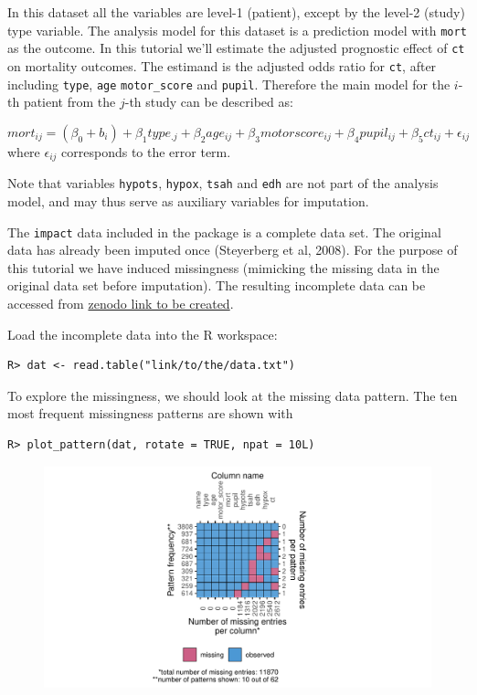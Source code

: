 \documentclass[
  article]{jss}
\begin{document}
In this dataset all the variables are level-1 (patient), except by the
level-2 (study) type variable. The analysis model for this dataset is a
prediction model with \texttt{mort} as the outcome. In this tutorial
we'll estimate the adjusted prognostic effect of \texttt{ct} on
mortality outcomes. The estimand is the adjusted odds ratio for
\texttt{ct}, after including \texttt{type}, \texttt{age}
\texttt{motor\_score} and \texttt{pupil}. Therefore the main model for
the \(i\)-th patient from the \(j\)-th study can be described as:

\[ mort_{ij} = (\beta_0 + b_i) + \beta_1type_{.j}+ \beta_2age_{ij}+ \beta_3motorscore_{ij} + \beta_4pupil_{ij} + \beta_5ct_{ij}+\epsilon_{ij}\]
where \(\epsilon_{ij}\) corresponds to the error term.

Note that variables \texttt{hypots}, \texttt{hypox}, \texttt{tsah} and
\texttt{edh} are not part of the analysis model, and may thus serve as
auxiliary variables for imputation.

The \texttt{impact} data included in the  package is a
complete data set. The original data has already been imputed once
(Steyerberg et al, 2008). For the purpose of this tutorial we have
induced missingness (mimicking the missing data in the original data set
before imputation). The resulting incomplete data can be accessed from
\href{https://zenodo.com}{zenodo link to be created}.

Load the incomplete data into the R workspace:

\begin{verbatim}
R> dat <- read.table("link/to/the/data.txt") 
\end{verbatim}

To explore the missingness, we should look at the missing data pattern.
The ten most frequent missingness patterns are shown with

\begin{verbatim}
R> plot_pattern(dat, rotate = TRUE, npat = 10L)  
\end{verbatim}

\begin{figure}[h]

{\centering \includegraphics{manuscript_files/figure-pdf/unnamed-chunk-28-1.pdf}

}

\end{figure}
\end{document}
